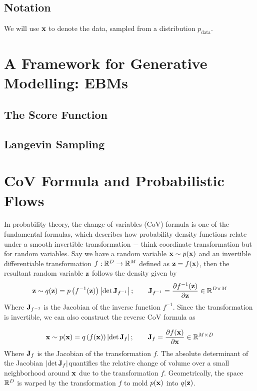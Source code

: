 \documentclass[a4paper, 11pt]{article}
\begin{document}
\subsection{Notation}
We will use $\mbox{$\mbox{$\mathbf{x}$}$}$ to denote the data, sampled from a distribution $p_{\text{data}}$.


\section{A Framework for Generative Modelling: EBMs}

\subsection{The Score Function}

\subsection{Langevin Sampling}

\section{CoV Formula and Probabilistic Flows}
In probability theory, the change of variables (CoV) formula is one of the fundamental formulas, which describes how probability density functions relate under a smooth invertible transformation $-$ think coordinate transformation but for random variables. Say we have a random variable $\mbox{$\mbox{$\mathbf{x}$}$} \sim p(\mbox{$\mbox{$\mathbf{x}$}$})$ and an invertible differentiable transformation $f: \mathbb{R}^D \to \mathbb{R}^M$ defined as $\mbox{$\mbox{$\mathbf{z}$}$} = f(\mbox{$\mbox{$\mathbf{x}$}$})$, then the resultant random variable $\mbox{$\mbox{$\mathbf{z}$}$}$ follows the density given by
\begin{align}
    \mbox{$\mbox{$\mathbf{z}$}$} \sim q(\mbox{$\mbox{$\mathbf{z}$}$}) = p\left(f^{-1}(\mbox{$\mbox{$\mathbf{z}$}$}) \right)\left |\det \mbox{$\mbox{$\mathbf{J}$}$}_{f^{-1}} \right|; \qquad \mbox{$\mbox{$\mathbf{J}$}$}_{f^{-1}} = \frac{\partial f^{-1}(\mbox{$\mbox{$\mathbf{z}$}$})}{\partial \mbox{$\mbox{$\mathbf{z}$}$}} \in \mathbb{R}^{D \times M}
\end{align}
Where $\mbox{$\mbox{$\mathbf{J}$}$}_{f^{-1}}$ is the Jacobian of the inverse function $f^{-1}$. Since the transformation is invertible, we can also construct the reverse CoV formula as

\begin{align}
    \mbox{$\mbox{$\mathbf{x}$}$} \sim p(\mbox{$\mbox{$\mathbf{x}$}$}) = q\left(f(\mbox{$\mbox{$\mathbf{x}$}$}) \right)\left |\det \mbox{$\mbox{$\mathbf{J}$}$}_{f} \right|; \qquad \mbox{$\mbox{$\mathbf{J}$}$}_{f} = \frac{\partial f(\mbox{$\mbox{$\mathbf{x}$}$})}{\partial \mbox{$\mbox{$\mathbf{x}$}$}} \in \mathbb{R}^{M \times D}
\end{align}
Where $\mbox{$\mbox{$\mathbf{J}$}$}_{f}$ is the Jacobian of the transformation $f$. The absolute determinant of the Jacobian $\left |\det \mbox{$\mbox{$\mathbf{J}$}$}_{f} \right|$quantifies the relative change of volume over a small neighborhood around $\mbox{$\mbox{$\mathbf{x}$}$}$ due to the transformation $f$. Geometrically, the space $\mathbb{R}^D$ is warped by the transformation $f$ to mold $p(\mbox{$\mbox{$\mathbf{x}$}$})$ into $q(\mbox{$\mbox{$\mathbf{z}$}$})$.
\end{document}
